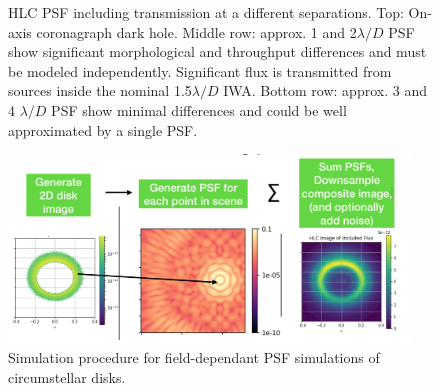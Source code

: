 \documentclass[]{spie}  %
\begin{document}
\begin{figure}[!ht]
    \caption{\acrshort{HLC} \acrshort{PSF} including transmission at a different separations. 
    Top: On-axis coronagraph dark hole. 
    Middle row: approx. 1 and 2$\lambda/D$ PSF show significant morphological and throughput differences and must be modeled independently.
    Significant flux is transmitted from sources inside the nominal 1.5$\lambda/D$ \acrshort{IWA}.
    Bottom row: approx. 3 and 4 $\lambda/D$ PSF show minimal differences and could be well approximated by a single \acrshort{PSF}. }
    \label{fig:psfs}
\end{figure}
\begin{figure}[!ht]
    \centering
    \includegraphics[width=0.95\textwidth]{flow.png}
    \caption{Simulation procedure for field-dependant \acrshort{PSF} simulations of circumstellar disks.}
    \label{fig:flow}
\end{figure}
\end{document}

